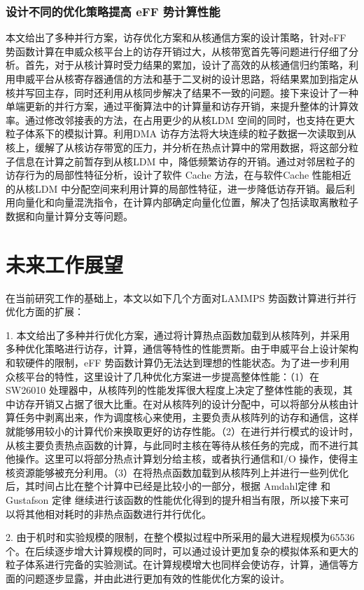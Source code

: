 \subsubsection{设计不同的优化策略提高 eFF 势计算性能}
本文给出了多种并行方案，访存优化方案和从核通信方案的设计策略，针对eFF 势函数计算在申威众核平台上的访存开销过大，从核带宽首先等问题进行仔细了分析。首先，对于从核计算时受力结果的累加，设计了高效的从核通信归约策略，利用申威平台从核寄存器通信的方法和基于二叉树的设计思路，将结果累加到指定从核并写回主存，同时还利用从核同步解决了结果不一致的问题。接下来设计了一种单端更新的并行方案，通过平衡算法中的计算量和访存开销，来提升整体的计算效率。通过修改邻接表的方法，在占用更少的从核LDM 空间的同时，也支持在更大粒子体系下的模拟计算。利用DMA 访存方法将大块连续的粒子数据一次读取到从核上，缓解了从核访存带宽的压力，并分析在热点计算中的常用数据，将这部分粒子信息在计算之前暂存到从核LDM 中，降低频繁访存的开销。通过对邻居粒子的访存行为的局部性特征分析，设计了软件 Cache 方法，在与软件Cache 性能相近的从核LDM 中分配空间来利用计算的局部性特征，进一步降低访存开销。最后利用向量化和向量混洗指令，在计算内部确定向量化位置，解决了包括读取离散粒子数据和向量计算分支等问题。

\section{未来工作展望}
在当前研究工作的基础上，本文以如下几个方面对LAMMPS 势函数计算进行并行优化方面的扩展：

1. 本文给出了多种并行优化方案，通过将计算热点函数加载到从核阵列，并采用多种优化策略进行访存，计算，通信等特性的性能贾斯。由于申威平台上设计架构和软硬件的限制，eFF 势函数计算仍无法达到理想的性能状态。为了进一步利用众核平台的特性，这里设计了几种优化方案进一步提高整体性能：（1）在SW26010 处理器中，从核阵列的性能发挥很大程度上决定了整体性能的表现，其中访存开销又占据了很大比重。在对从核阵列的设计分配中，可以将部分从核由计算任务中剥离出来，作为调度核心来使用，主要负责从核阵列的访存和通信，这样就能够用较小的计算代价来换取更好的访存性能。（2）在进行并行模式的设计时，从核主要负责热点函数的计算，与此同时主核在等待从核任务的完成，而不进行其他操作。这里可以将部分热点计算划分给主核，或者执行通信和I/O 操作，使得主核资源能够被充分利用。（3）在将热点函数加载到从核阵列上并进行一些列优化后，其时间占比在整个计算中已经是比较小的一部分，根据 Amdahl定律\cite{amdahl1967validity} 和 Gustafson 定律\cite{gustafson1988reevaluating} 继续进行该函数的性能优化得到的提升相当有限，所以接下来可以将其他相对耗时的非热点函数进行并行优化。

2. 由于机时和实验规模的限制，在整个模拟过程中所采用的最大进程规模为65536 个。在后续逐步增大计算规模的同时，可以通过设计更加复杂的模拟体系和更大的粒子体系进行完备的实验测试。在计算规模增大也同样会使访存，计算，通信等方面的问题逐步显露，并由此进行更加有效的性能优化方案的设计。
